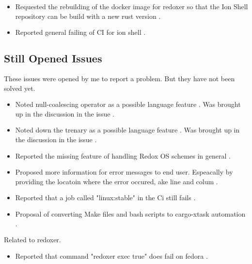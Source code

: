 \begin{itemize}
	\item Requested the rebuilding of the docker image for \gls{redoxer} so that the Ion Shell repository can be build with a new rust version \cite{issue_request_new_docker_version}.
	\item Reported general failing of CI for ion shell \cite{issue_failing_ci}.
\end{itemize}

\subsection{Still Opened Issues}

These issues were opened by me to report a problem. But they have not been solved yet.

\begin{itemize}
	\item Noted null-coalescing operator as a possible language feature \cite{issue_null_coalescing_operator}. Was brought up in the discussion in the issue \cite{pr_subst_method}.
	\item Noted down the trenary as a possible language feature \cite{issue_ternary_operator_arrays_strings}. Was brought up in the discussion in the issue \cite{pr_subst_method}.
	\item Reported the missing feature of handling Redox OS schemes in general \cite{issue_disk_scheme}.
	\item Proposed more information for error messages to end user. Espeacally by providing the locatoin where the error occured, ake line and colum \cite{issue_enrich_error_message_information}.
	\item Reported that a job called "linux:stable" in the Ci still fails \cite{issue_ci_linux_stable_fail}.
	\item Proposal of converting Make files and bash scripts to cargo-xtask automation \cite{issue_convert_make_files_to_xtask}.
\end{itemize}

Related to \gls{redoxer}.

\begin{itemize}
	\item Reported that command "redoxer exec true" does fail on fedora \cite{issue_redoxer_exec_true}.
\end{itemize}


